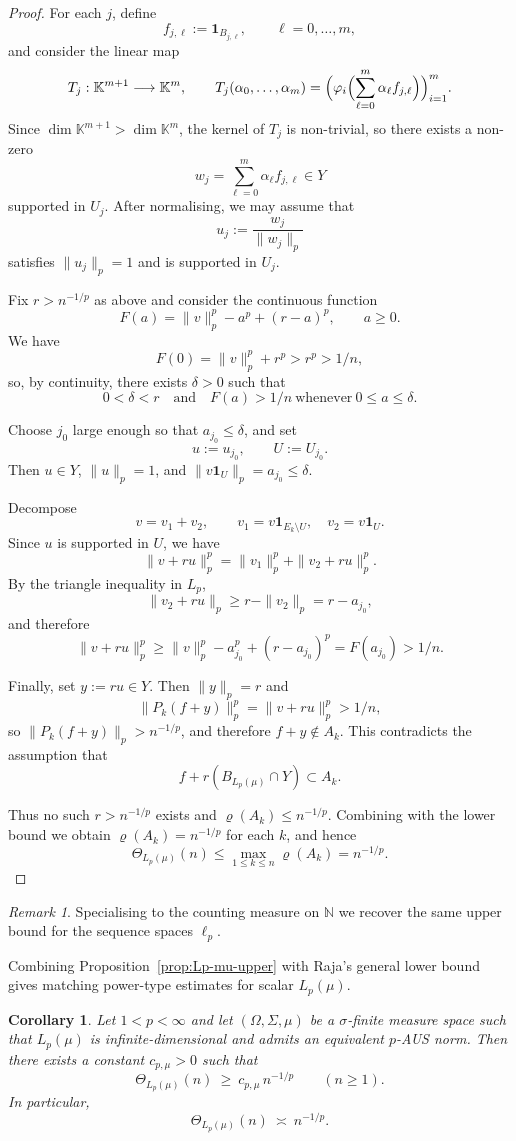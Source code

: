 \documentclass[reqno,11pt]{amsart}
\theoremstyle{plain}
\newtheorem{corollary}[theorem]{Corollary}
\theoremstyle{definition}
\theoremstyle{remark}
\newtheorem{remark}[theorem]{Remark}
\newcommand{\K}{\mathbb{K}}
\renewcommand{\le}{\leqslant}
\renewcommand{\ge}{\geqslant}
\begin{document}
\begin{proof}
For each $j$, define
\[
f_{j,\ell}:=\mathbf 1_{B_{j,\ell}},\qquad \ell=0,\dots,m,
\]
and consider the linear map
\[
T_j:\K^{m+1}\longrightarrow\K^m,\qquad
T_j(\alpha_0,\dots,\alpha_m)
=
\Bigl(\varphi_i\Bigl(\sum_{\ell=0}^m \alpha_\ell f_{j,\ell}\Bigr)\Bigr)_{i=1}^m.
\]
Since $\dim \K^{m+1}>\dim \K^m$, the kernel of $T_j$ is non-trivial, so
there exists a non-zero
\[
w_j=\sum_{\ell=0}^m \alpha_\ell f_{j,\ell}\in Y
\]
supported in $U_j$. After normalising, we may assume that
\[
u_j:=\frac{w_j}{\|w_j\|_p}
\]
satisfies $\|u_j\|_p=1$ and is supported in $U_j$.

Fix $r>n^{-1/p}$ as above and consider the continuous function
\[
F(a)
=
\|v\|_p^p - a^p + (r-a)^p,\qquad a\ge0.
\]
We have
\[
F(0)=\|v\|_p^p+r^p>r^p>1/n,
\]
so, by continuity, there exists $\delta>0$ such that
\[
0<\delta<r
\quad\text{and}\quad
F(a)>1/n \ \text{whenever}\ 0\le a\le\delta.
\]

Choose $j_0$ large enough so that $a_{j_0}\le\delta$, and set
\[
u:=u_{j_0},\qquad U:=U_{j_0}.
\]
Then $u\in Y$, $\|u\|_p=1$, and $\|v\mathbf 1_U\|_p=a_{j_0}\le\delta$.

Decompose
\[
v=v_1+v_2,
\qquad
v_1=v\mathbf 1_{E_k\setminus U},\quad
v_2=v\mathbf 1_U.
\]
Since $u$ is supported in $U$, we have
\[
\|v+ru\|_p^p
=
\|v_1\|_p^p+\|v_2+ru\|_p^p.
\]
By the triangle inequality in $L_p$,
\[
\|v_2+ru\|_p
\ge r-\|v_2\|_p
= r-a_{j_0},
\]
and therefore
\[
\|v+ru\|_p^p
\ge
\|v\|_p^p-a_{j_0}^p+(r-a_{j_0})^p
=
F(a_{j_0})
>
1/n.
\]

Finally, set $y:=ru\in Y$. Then $\|y\|_p=r$ and
\[
\|P_k(f+y)\|_p^p
=
\|v+ru\|_p^p
>
1/n,
\]
so $\|P_k(f+y)\|_p>n^{-1/p}$, and therefore $f+y\notin A_k$. This
contradicts the assumption that
\[
f+r(B_{L_p(\mu)}\cap Y)\subset A_k.
\]

Thus no such $r>n^{-1/p}$ exists and $\varrho(A_k)\le n^{-1/p}$. Combining
with the lower bound we obtain $\varrho(A_k)=n^{-1/p}$ for each $k$, and
hence
\[
\Theta_{L_p(\mu)}(n)
\le \max_{1\le k\le n}\varrho(A_k)
= n^{-1/p}.
\]
\end{proof}


\begin{remark}
Specialising to the counting measure on $\mathbb{N}$ we recover the same upper
bound for the sequence spaces $\ell_p$.
\end{remark}

Combining Proposition~\ref{prop:Lp-mu-upper} with Raja's general lower bound gives matching power-type estimates for scalar $L_p(\mu)$.

\begin{corollary}\label{cor:Lp-mu-sharp}
Let $1<p<\infty$ and let $(\Omega,\Sigma,\mu)$ be a $\sigma$-finite
measure space such that $L_p(\mu)$ is infinite-dimensional and admits an
equivalent $p$-AUS norm. Then there exists a constant $c_{p,\mu}>0$ such that
\[
\Theta_{L_p(\mu)}(n)\ \ge\ c_{p,\mu}\,n^{-1/p}
\qquad(n\ge1).
\]
In particular,
\[
\Theta_{L_p(\mu)}(n)\ \asymp\ n^{-1/p}.
\]
\end{corollary}
\end{document}
